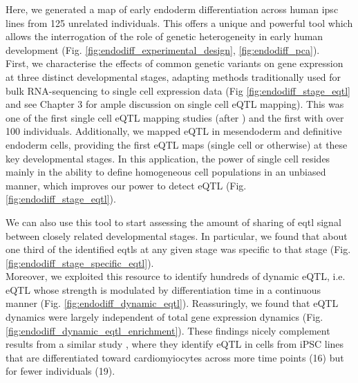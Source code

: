
Here, we generated a map of early endoderm differentiation across human \gls{ipsc} lines from 125 unrelated individuals.
This offers a unique and powerful tool which allows the interrogation of the role of genetic heterogeneity in early human development (Fig. \ref{fig:endodiff_experimental_design}, \ref{fig:endodiff_pca}). \\

First, we characterise the effects of common genetic variants on gene expression at three distinct developmental stages, adapting methods traditionally used for bulk RNA-sequencing to single cell expression data (Fig \ref{fig:endodiff_stage_eqtl} and see Chapter 3 for ample discussion on single cell eQTL mapping).
This was one of the first single cell eQTL mapping studies (after \cite{van2018single}) and the first with over 100 individuals.
Additionally, we mapped eQTL in mesendoderm and definitive endoderm cells, providing the first eQTL maps (single cell or otherwise) at these key developmental stages. 
In this application, the power of single cell resides mainly in the ability to define homogeneous cell populations in an unbiased manner, which improves our power to detect eQTL (Fig. \ref{fig:endodiff_stage_eqtl}).

We can also use this tool to start assessing the amount of sharing of \gls{eqtl} signal between closely related developmental stages.
In particular, we found that about one third of the identified \glspl{eqtl} at any given stage was specific to that stage (Fig. \ref{fig:endodiff_stage_specific_eqtl}).\\

Moreover, we exploited this resource to identify hundreds of dynamic eQTL, i.e. eQTL whose strength is modulated by differentiation time in a continuous manner (Fig. \ref{fig:endodiff_dynamic_eqtl}).
Reassuringly, we found that eQTL dynamics were largely independent of total gene expression dynamics (Fig. \ref{fig:endodiff_dynamic_eqtl_enrichment}).
These findings nicely complement results from a similar study \cite{strober2019dynamic}, where they identify eQTL in cells from iPSC lines that are differentiated toward cardiomyiocytes across more time points (16) but for fewer individuals (19).\\

